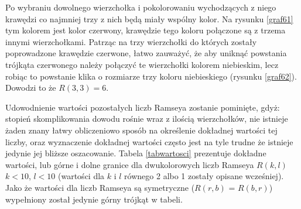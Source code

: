 Po wybraniu dowolnego wierzchołka i pokolorowaniu wychodzących z niego krawędzi co najmniej trzy z nich będą miały wspólny kolor. Na rysunku \ref{graf61} tym kolorem jest kolor czerwony, krawędzie tego koloru połączone są z trzema innymi wierzchołkami. Patrząc na trzy wierzchołki do których zostały poprowadzone krawędzie czerwone, łatwo zauważyć, że aby uniknąć powstania trójkąta czerwonego należy połączyć te wierzchołki kolorem niebieskim, lecz robiąc to powstanie klika o rozmiarze trzy koloru niebieskiego (rysunku \ref{graf62}). Dowodzi to że $R(3,3) = 6$.
    

\hfill \par


 Udowodnienie wartości pozostałych liczb Ramseya zostanie pominięte, gdyż: stopień skomplikowania dowodu rośnie wraz z ilością wierzchołków, nie istnieje żaden znany łatwy obliczeniowo sposób na określenie dokładnej wartości tej liczby, oraz wyznaczenie dokładnej wartości często jest na tyle trudne że istnieje jedynie jej bliższe oszacowanie. Tabela \ref{tabwartosci} prezentuje dokładne wartości, lub górne i dolne granice dla dwukolorowych liczb Ramseya $R(k,l)$ $k<10$, $l<10$ (wartości dla $k$ i $l$ równego 2 albo 1 zostały opisane wcześniej). Jako że wartości dla liczb Ramseya są symetryczne ($R(r,b)$ = $R(b,r)$) wypełniony został jedynie górny trójkąt w tabeli.
 
